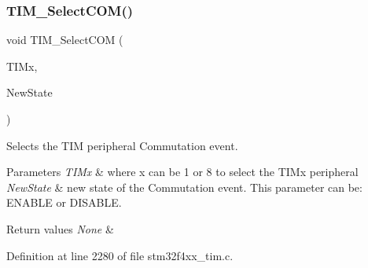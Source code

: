 \subsubsection{\texorpdfstring{T\+I\+M\+\_\+\+Select\+C\+O\+M()}{TIM\_SelectCOM()}}
{\footnotesize\ttfamily void T\+I\+M\+\_\+\+Select\+C\+OM (\begin{DoxyParamCaption}\item[{\hyperlink{struct_t_i_m___type_def}{T\+I\+M\+\_\+\+Type\+Def} $\ast$}]{T\+I\+Mx,  }\item[{Functional\+State}]{New\+State }\end{DoxyParamCaption})}



Selects the T\+IM peripheral Commutation event. 


\begin{DoxyParams}{Parameters}
{\em T\+I\+Mx} & where x can be 1 or 8 to select the T\+I\+Mx peripheral \\
\hline
{\em New\+State} & new state of the Commutation event. This parameter can be\+: E\+N\+A\+B\+LE or D\+I\+S\+A\+B\+LE. \\
\hline
\end{DoxyParams}

\begin{DoxyRetVals}{Return values}
{\em None} & \\
\hline
\end{DoxyRetVals}


Definition at line 2280 of file stm32f4xx\+\_\+tim.\+c.

